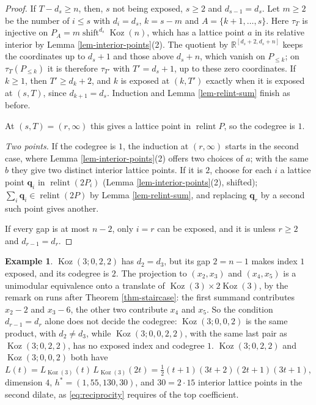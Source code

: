 \documentclass[11pt, a4paper, abstract=yes]{scrartcl}
\theoremstyle{definition}
\newtheorem{mexample}[definition]{Example}
\theoremstyle{remark}
\theoremstyle{plain}
\newcommand{\vek}[1]{\boldsymbol{#1}}
\theoremstyle{remark}
\theoremstyle{plain}
\newcommand{\Koz}{\operatorname{Koz}}
\newcommand{\shift}{\operatorname{shift}}
\newcommand{\relint}{\operatorname{relint}}
\begin{document}
\begin{proof}
If \(T-d_s\ge n\), then, \(s\) not being exposed, \(s\ge2\) and \(d_{s-1}=d_s\). Let \(m\ge2\) be the number
of \(i\le s\) with \(d_i=d_s\), \(k=s-m\) and \(A=\lbrace k+1,\dots,s\rbrace\). Here \(\tau_T\) is injective on
\(P_A=m\shift^{d_s}\Koz(n)\), which has a lattice point \(a\) in its relative interior by Lemma
\ref{lem-interior-points}(2). The quotient by \(\mathbb R^{[d_s+2,d_s+n]}\) keeps the coordinates up to
\(d_s+1\) and those above \(d_s+n\), which vanish on \(P_{\le k}\); on \(\tau_T(P_{\le k})\) it is
therefore \(\tau_{T'}\) with \(T'=d_s+1\), up to these zero coordinates. If \(k\ge1\), then
\(T'\ge d_k+2\), and \(k\) is exposed at \((k,T')\) exactly when it is exposed at \((s,T)\), since
\(d_{k+1}=d_s\). Induction and Lemma \ref{lem-relint-sum} finish as before.

At \((s,T)=(r,\infty)\) this gives a lattice point in \(\relint P\), so the codegree is \(1\).

\emph{Two points.} If the codegree is \(1\), the induction at \((r,\infty)\) starts in the second case, where
Lemma \ref{lem-interior-points}(2) offers two choices of \(a\); with the same \(b\) they give two distinct
interior lattice points. If it is \(2\), choose for each \(i\) a lattice point \(\vek q_i\) in
\(\relint(2P_i)\) (Lemma \ref{lem-interior-points}(2), shifted); \(\sum_i\vek q_i\in\relint(2P)\) by Lemma
\ref{lem-relint-sum}, and replacing \(\vek q_r\) by a second such point gives another.

If every gap is at most \(n-2\), only \(i=r\) can be exposed, and it is unless \(r\ge2\) and
\(d_{r-1}=d_r\).
\end{proof}

\begin{mexample}
\(\Koz(3;0,2,2)\) has \(d_2=d_3\), but its gap \(2=n-1\) makes index \(1\) exposed, and its codegree is
\(2\). The projection to \((x_2,x_3)\) and \((x_4,x_5)\) is a unimodular equivalence onto a translate
of \(\Koz(3)\times2\Koz(3)\), by the remark on runs after Theorem \ref{thm-staircase}: the first summand
contributes \(x_2-2\) and \(x_3-6\), the other two contribute \(x_4\) and \(x_5\). So the condition
\(d_{r-1}=d_r\) alone does not decide the codegree: \(\Koz(3;0,0,2)\) is the same product, with
\(d_2\ne d_3\), while \(\Koz(3;0,0,2,2)\), with the same last pair as \(\Koz(3;0,2,2)\), has no exposed
index and codegree \(1\). \(\Koz(3;0,2,2)\) and \(\Koz(3;0,0,2)\) both have \(L(t)=L_{\Koz(3)}(t)\,L_{\Koz(3)}(2t)=\tfrac12(t+1)(3t+2)(2t+1)(3t+1)\), dimension
\(4\), \(h^*=(1,55,130,30)\), and \(30=2\cdot15\) interior lattice points in the second dilate, as
\eqref{eq:reciprocity} requires of the top coefficient.
\label{ex-codegree-product}
\end{mexample}
\end{document}
